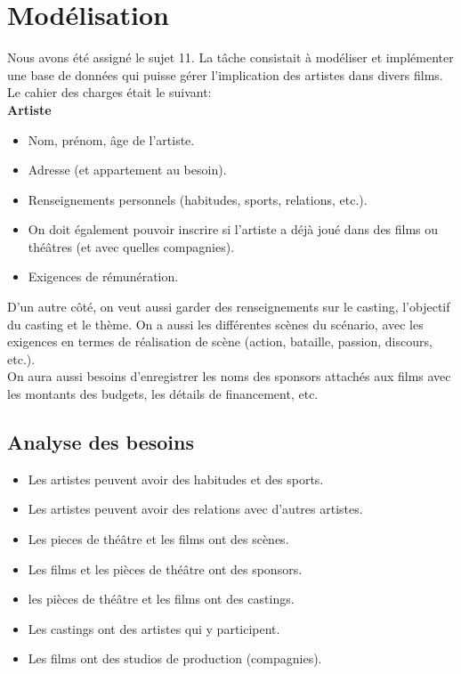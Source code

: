 \documentclass{article}
\newcommand{\n}{\\ [6pt]}
\begin{document}
\section{Modélisation}
Nous avons été assigné le sujet 11. La tâche consistait à modéliser
et implémenter une base de données qui puisse gérer l’implication des
artistes dans divers films.\n
Le cahier des charges était le suivant:\n
\textbf{Artiste}
\begin{itemize}
\item Nom, prénom, âge de l’artiste.
\item Adresse (et appartement au besoin).
\item Renseignements personnels (habitudes, sports, relations, etc.). 
\item On doit également pouvoir inscrire si l’artiste a déjà joué dans des films ou théâtres (et avec quelles compagnies). 
\item Exigences de rémunération.
\end{itemize}
D’un autre côté, on veut aussi garder des renseignements sur le casting, l’objectif du casting et le thème. On a aussi les différentes scènes du scénario, avec les exigences en termes de réalisation de scène (action, bataille, passion, discours, etc.).\n
On aura aussi besoins d’enregistrer les noms des sponsors attachés aux
films avec les montants des budgets, les détails de financement,
etc.\n


\subsection{Analyse des besoins}
\begin{itemize}
\item Les artistes peuvent avoir des habitudes et des sports.
\item Les artistes peuvent avoir des relations avec d'autres artistes.
\item Les pieces de théâtre et les films ont des scènes.
\item Les films et les pièces de théâtre ont des sponsors.
\item les pièces de théâtre et les films ont des castings.
\item Les castings ont des artistes qui y participent.
\item Les films ont des studios de production (compagnies).
\end{itemize}

  
\end{document}
